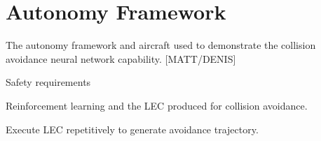 \section{Autonomy Framework}

 The autonomy framework and aircraft used to demonstrate the collision avoidance neural network capability. [MATT/DENIS]

Safety requirements

Reinforcement learning and the LEC produced for collision avoidance.  

Execute LEC repetitively to generate avoidance trajectory. 
